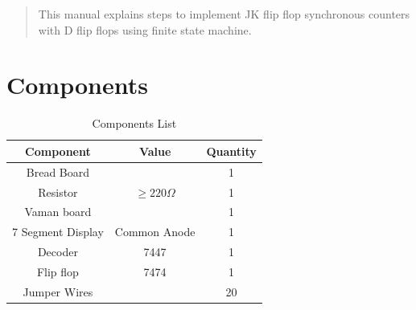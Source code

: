 \documentclass[journal,12pt,twocolumn]{IEEEtran}
\begin{document}
\maketitle

\tableofcontents

\bigskip

\renewcommand{\thefigure}{\theenumi}
\renewcommand{\thetable}{\theenumi}

\setcounter{figure}{0}
\setcounter{table}{0}

\begin{abstract}
This manual explains steps to implement JK flip flop synchronous counters with D flip flops using finite state machine.
\end{abstract}

\section{Components}

\begin{table}[h!] 
	\begin{center}
		\begin{tabular}{ |c|c|c| } 
			\hline
			\multicolumn{1}{|c|}{\textbf{Component}} &\multicolumn{1}{|c|}{\textbf{Value}} & \multicolumn{1}{|c|}{\textbf{Quantity}}  \\
			\hline
		     Bread Board & & 1 \\ 
		     \hline
		     Resistor & $\ge 220 \Omega$ & 1  \\ 
			 \hline
		     Vaman board &  & 1   \\ 
		     \hline
		     7 Segment Display & Common Anode & 1  \\
			\hline
			Decoder & 7447 & 1 \\
			\hline
			Flip flop & 7474 & 1 \\
			\hline 
			Jumper Wires & & 20 \\
			\hline
		\end{tabular}
		\caption{Components List}
		\label{table:Component_table}
	\end{center}
\end{table}
\end{document}
